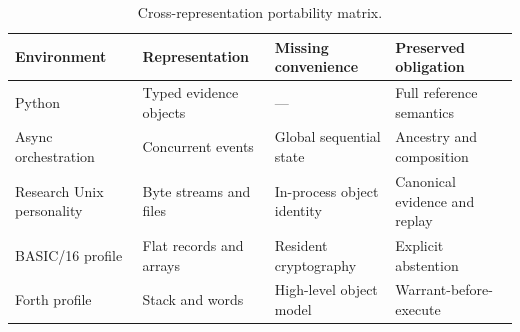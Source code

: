 \begin{table}[ht]
\centering\small
\caption{Cross-representation portability matrix.}
\begin{tabular}{p{.18\linewidth}p{.20\linewidth}p{.25\linewidth}p{.25\linewidth}}
\toprule
Environment & Representation & Missing convenience & Preserved obligation \\
\midrule
Python & Typed evidence objects & --- & Full reference semantics \\
Async orchestration & Concurrent events & Global sequential state & Ancestry and composition \\
Research Unix personality & Byte streams and files & In-process object identity & Canonical evidence and replay \\
BASIC/16 profile & Flat records and arrays & Resident cryptography & Explicit abstention \\
Forth profile & Stack and words & High-level object model & Warrant-before-execute \\
\bottomrule
\end{tabular}
\end{table}

